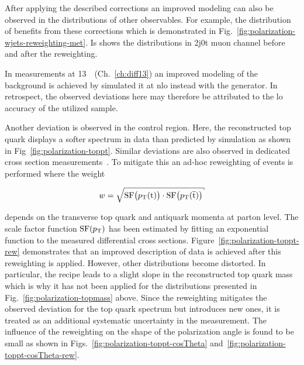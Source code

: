 After applying the described \wjets corrections an improved modeling can also be observed in the distributions of other observables. For example, the distribution of \met benefits from these corrections which is demonstrated in Fig.~\ref{fig:polarization-wjets-reweighting-met}. Is shows the \met distributions in 2j0t muon channel before and after the reweighting. 


In measurements at 13~\TeV~(Ch.~\ref{ch:diff13}) an improved modeling of the \wjets background is achieved by simulated it at \gls{nlo} instead with the \MGAMC generator. In retrospect, the observed deviations here may therefore be attributed to the \gls{lo} accuracy of the utilized \MG \wjets sample.

Another deviation is observed in the \ttbar control region. Here, the reconstructed top quark \pt displays a softer spectrum in data than predicted by simulation as shown in Fig~\ref{fig:polarization-toppt}. Similar deviations are also observed in dedicated \ttbar cross section measurements~\cite{Chatrchyan:2012saa,Khachatryan:2015oqa}. To mitigate this an ad-hoc reweighting of \ttbar events is performed where the weight

\begin{equation}
w=\sqrt{\mathrm{SF}\big(\pt(\mathrm{t})\big)\cdot\mathrm{SF}\big(\pt(\bar{\mathrm{t}})\big)}
\end{equation} 

depends on the transverse top quark and antiquark momenta at parton level. The scale factor function $\mathrm{SF}(p_\mathrm{T})$ has been estimated by fitting an exponential function to the measured differential \ttbar cross sections. Figure~\ref{fig:polarization-toppt-rew} demonstrates that an improved description of data is achieved after this reweighting is applied. However, other distributions become distorted. In particular, the recipe leads to a slight slope in the reconstructed top quark mass which is why it has not been applied for the distributions presented in Fig.~\ref{fig:polarization-topmass} above. Since the reweighting mitigates the observed deviation for the top quark \pt spectrum but introduces new ones, it is treated as an additional systematic uncertainty in the measurement. The influence of the reweighting on the shape of the polarization angle is found to be small as shown in Figs.~\ref{fig:polarization-toppt-cosTheta} and~\ref{fig:polarization-toppt-cosTheta-rew}.

